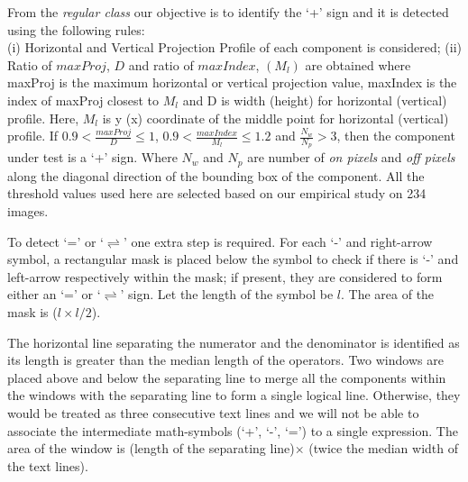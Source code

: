 From the \emph{regular class} our objective is to identify the `+' sign
and it is detected using the following rules: \\
(i)  Horizontal and Vertical Projection Profile of each component is considered;
(ii) Ratio of  $maxProj$, $D$ and ratio of $maxIndex$, $(M_l)$
are obtained where maxProj is the maximum horizontal or vertical projection value, maxIndex is the index of maxProj closest to $M_l$ and D is width (height) for horizontal (vertical) profile. Here, $M_l$ is y (x) coordinate of the middle point for  horizontal (vertical) profile. 
If  $0.9 < \frac{maxProj}{D} \leq 1$,  $0.9 < \frac{maxIndex}{M_l} \leq 1.2$ and $\frac{N_w}{N_p} > 3$, then the component under test is a `+' sign.
Where $N_w$ and $N_p$ are number of \emph{on pixels} and \emph{off pixels} along the 
diagonal direction of the bounding box of the component. All the threshold values used  here are selected based on our empirical study on 234 images.

To detect `=' or `$\rightleftharpoons$' one extra step is
required. 
For each `-' and right-arrow  symbol, a rectangular mask is
placed below the symbol to check if there is `-' and left-arrow respectively within
the mask; if  present, they are considered to form either an `=' or
`$\rightleftharpoons$' sign. Let the length of the symbol
be $l$. The area of the mask is ($l \times l/2$). 

The horizontal line separating the numerator and the denominator
is identified as its length is greater than the median length of
the operators. Two windows are placed above and below the
separating line to merge all the components within the windows
with the separating line to form a single logical line.
Otherwise, they would be treated as three consecutive text lines
and we will not be able to associate the intermediate
math-symbols (‘+’, ‘-’, ‘=’) to a single expression. The area of
the window is (length of the separating line)$\times$ (twice the
median width of the text lines).

